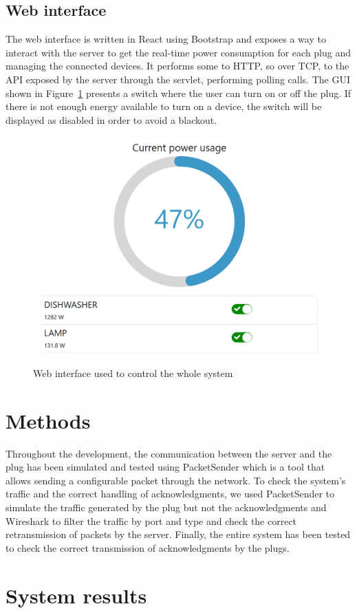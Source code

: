 \documentclass[conference]{IEEEtran}
\begin{document}
\subsection{Web interface}\label{WI}
The web interface is written in React using Bootstrap and exposes a way to interact with the server to get 
the real-time power consumption for each plug and managing the connected devices. It performs some to HTTP, so over TCP, to the API exposed by the server through the servlet, performing polling calls. The GUI shown in Figure~\ref{fig:simulatedwebapp} presents a switch where the user can turn on or off the plug. If there is not enough energy available to turn on a device, the switch will be displayed as disabled in order to avoid a blackout.
\begin{figure}[htbp]
	\centering
	\includegraphics[width=0.7\linewidth]{assets/simulated_webapp}
	\caption{Web interface used to control the whole system}
	\label{fig:simulatedwebapp}
\end{figure}

\section{Methods}
Throughout the development, the communication between the server and the plug has been simulated and tested using PacketSender which is a tool that allows sending a configurable packet through the network. To check the system's traffic and the correct handling of acknowledgments, we used PacketSender to simulate the traffic generated by the plug but not the acknowledgments and Wireshark to filter the traffic by port and type and check the correct retransmission of packets by the server. Finally, the entire system has been tested to check the correct transmission of acknowledgments by the plugs.

\section{System results}
\end{document}
